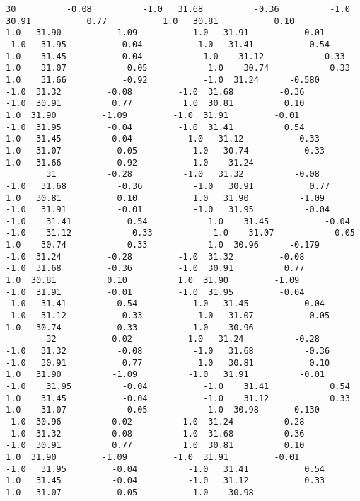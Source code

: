 \documentclass[11pt]{article}
\begin{document}
\begin{Verbatim}[commandchars=\\\{\}]
        30          -0.08          -1.0   31.68          -0.36          -1.0   30.91           0.77           1.0   30.81           0.10           1.0   31.90          -1.09          -1.0   31.91          -0.01          -1.0   31.95          -0.04          -1.0   31.41           0.54           1.0    31.45          -0.04           -1.0    31.12            0.33            1.0    31.07            0.05            1.0    30.74            0.33            1.0    31.66           -0.92           -1.0  31.24      -0.580         -1.0  31.32         -0.08         -1.0  31.68         -0.36         -1.0  30.91          0.77          1.0  30.81          0.10          1.0  31.90         -1.09         -1.0  31.91         -0.01         -1.0  31.95         -0.04         -1.0  31.41          0.54          1.0   31.45         -0.04          -1.0   31.12           0.33           1.0   31.07           0.05           1.0   30.74           0.33           1.0   31.66          -0.92          -1.0    31.24   
        31          -0.28          -1.0   31.32          -0.08          -1.0   31.68          -0.36          -1.0   30.91           0.77           1.0   30.81           0.10           1.0   31.90          -1.09          -1.0   31.91          -0.01          -1.0   31.95          -0.04          -1.0    31.41           0.54            1.0    31.45           -0.04           -1.0    31.12            0.33            1.0    31.07            0.05            1.0    30.74            0.33            1.0  30.96      -0.179         -1.0  31.24         -0.28         -1.0  31.32         -0.08         -1.0  31.68         -0.36         -1.0  30.91          0.77          1.0  30.81          0.10          1.0  31.90         -1.09         -1.0  31.91         -0.01         -1.0  31.95         -0.04         -1.0   31.41          0.54           1.0   31.45          -0.04          -1.0   31.12           0.33           1.0   31.07           0.05           1.0   30.74           0.33           1.0    30.96   
        32           0.02           1.0   31.24          -0.28          -1.0   31.32          -0.08          -1.0   31.68          -0.36          -1.0   30.91           0.77           1.0   30.81           0.10           1.0   31.90          -1.09          -1.0   31.91          -0.01          -1.0    31.95          -0.04           -1.0    31.41            0.54            1.0    31.45           -0.04           -1.0    31.12            0.33            1.0    31.07            0.05            1.0  30.98      -0.130         -1.0  30.96          0.02          1.0  31.24         -0.28         -1.0  31.32         -0.08         -1.0  31.68         -0.36         -1.0  30.91          0.77          1.0  30.81          0.10          1.0  31.90         -1.09         -1.0  31.91         -0.01         -1.0   31.95         -0.04          -1.0   31.41           0.54           1.0   31.45          -0.04          -1.0   31.12           0.33           1.0   31.07           0.05           1.0    30.98   

\end{Verbatim}
\end{document}
